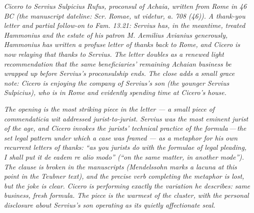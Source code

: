 
\textit{Cicero to Servius Sulpicius Rufus, proconsul of
Achaia, written from Rome in 46 BC (the manuscript
dateline: \textit{Scr. Romae, ut videtur, a. 708 (46)}).
A thank-you letter and partial follow-on to Fam. 13.21:
Servius has, in the meantime, treated Hammonius and the
estate of his patron M. Aemilius Avianius generously,
Hammonius has written a profuse letter of thanks back
to Rome, and Cicero is now relaying that thanks to
Servius. The letter doubles as a renewed light
recommendation that the same beneficiaries' remaining
Achaian business be wrapped up before Servius's
proconsulship ends. The close adds a small grace note:
Cicero is enjoying the company of Servius's son
(the younger Servius Sulpicius), who is in Rome and
evidently spending time at Cicero's house.}

\textit{The opening is the most striking piece in the
letter --- a small piece of \textit{commendaticia} wit
addressed jurist-to-jurist. Servius was the most
eminent jurist of the age, and Cicero invokes the
jurists' technical practice of the
\textit{formula}\,---\,the set legal pattern under which
a case was framed --- as a metaphor for his own
recurrent letters of thanks: ``as you jurists do with
the formulae of legal pleading, I shall put it
\textit{de eadem re alio modo}'' (``on the same matter,
in another mode''). The clause is broken in the
manuscripts (Mendelssohn marks a lacuna at this point in
the Teubner text), and the precise verb completing the
metaphor is lost, but the joke is clear. Cicero is
performing exactly the variation he describes: same
business, fresh formula. The piece is the warmest of
the cluster, with the personal disclosure about
Servius's son operating as its quietly affectionate
seal.}
